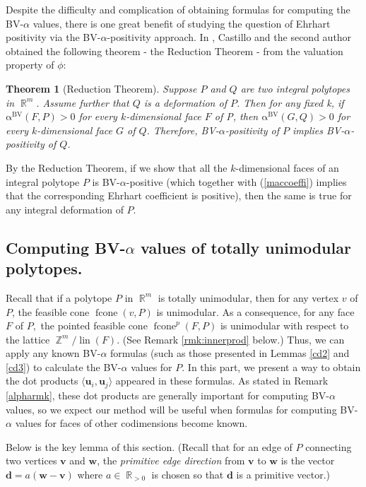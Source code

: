 \documentclass[12pt]{amsart}
\numberwithin{equation}{section}
\newtheorem{thm}{Theorem}[section]
\theoremstyle{definition}
\def\fcone{\operatorname{fcone}}
\def\lin{\operatorname{lin}}
\def\bv{{\boldsymbol{v}}}
\def\bw{{\boldsymbol{w}}}
\def\bd{\boldsymbol{d}}
\def\bu{\boldsymbol{u}}
\def\bvalpha{\operatorname{\alpha^{BV}}}
\def\Z{\operatorname{\mathbb{Z}}}
\def\R{\operatorname{\mathbb{R}}}
\begin{document}
Despite the difficulty and complication of obtaining formulas for computing the BV-$\alpha$ values, there is one great benefit of studying the question of Ehrhart positivity via the BV-$\alpha$-positivity approach. In \cite{castillo2018berline}, Castillo and the second author obtained the following theorem - the Reduction Theorem - from the valuation property of $\phi$:

\begin{thm} [Reduction Theorem] \label{reduction}
Suppose $P$ and $Q$ are two integral polytopes in $\R^{m}$. Assume further that $Q$ is a deformation of $P$. Then for any fixed k, if
$\bvalpha(F, P) > 0$ for every $k$-dimensional face $F$ of P, then $\bvalpha(G, Q) > 0$ for every $k$-dimensional
face $G$ of $Q$.
Therefore, BV-$\alpha$-positivity of $P$ implies BV-$\alpha$-positivity of $Q$.
\end{thm}

By the Reduction Theorem, if we show that all the $k$-dimensional faces of an integral polytope $P$ is BV-$\alpha$-positive (which together with (\ref{maccoeffi}) implies that the corresponding Ehrhart coefficient is positive), then the same is true for any integral deformation of $P$.

\subsection{Computing BV-$\alpha$ values of totally unimodular polytopes.} \label{subsec:simplecomp}


Recall that if a polytope $P$ in $\R^{m}$ is totally unimodular, then for any vertex $v$ of $P$, the feasible cone $\fcone(v,P)$ is unimodular. As a consequence, for any face $F$ of $P,$ the pointed feasible cone $\fcone^{p}(F,P)$ is unimodular with respect to the lattice $\Z^{m}/\lin(F)$. (See Remark \ref{rmk:innerprod} below.) 
Thus, we can apply any known BV-$\alpha$ formulas (such as those presented in Lemmas \ref{cd2} and \ref{cd3}) to calculate the BV-$\alpha$ values for $P$. In this part, we present a way to obtain the dot products $\langle \bu_{i}, \bu_{j} \rangle$ appeared in these formulas. As stated in Remark \ref{alpharmk}, these dot products are generally important for computing BV-$\alpha$ values, so we expect our method will be useful when formulas for computing BV-$\alpha$ values for faces of other codimensions become known. 



Below is the key lemma of this section. (Recall that for an edge of $P$ connecting two vertices $\bv$ and $\bw$, the \emph{primitive edge direction} from $\bv$ to $\bw$ is the vector $\bd = a(\bw-\bv)$ where $a\in \R_{>0}$ is chosen so that $\bd$ is a primitive vector.)
\end{document}
